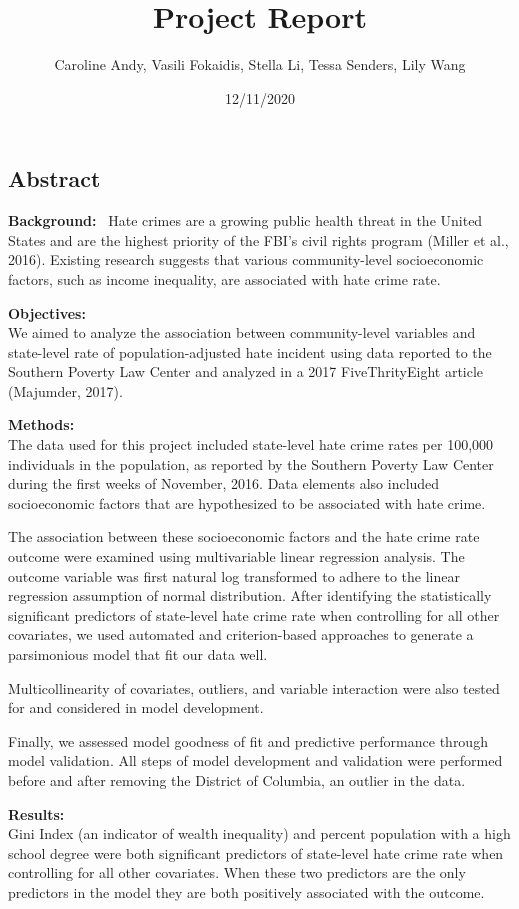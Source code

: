 \documentclass[
]{article}
\title{Project Report}
\author{Caroline Andy, Vasili Fokaidis, Stella Li, Tessa Senders, Lily Wang}
\date{12/11/2020}
\begin{document}
\maketitle

\hypertarget{abstract}{%
\subsection{Abstract}\label{abstract}}

\textbf{Background:}~ Hate crimes are a growing public health threat in
the United States and are the highest priority of the FBI's civil rights
program (Miller et al., 2016). Existing research suggests that various
community-level socioeconomic factors, such as income inequality, are
associated with hate crime rate.

\textbf{Objectives:}\\
We aimed to analyze the association between community-level variables
and state-level rate of population-adjusted hate incident using data
reported to the Southern Poverty Law Center and analyzed in a 2017
FiveThrityEight article (Majumder, 2017).

\textbf{Methods:}\\
The data used for this project included state-level hate crime rates per
100,000 individuals in the population, as reported by the Southern
Poverty Law Center during the first weeks of November, 2016. Data
elements also included socioeconomic factors that are hypothesized to be
associated with hate crime.

The association between these socioeconomic factors and the hate crime
rate outcome were examined using multivariable linear regression
analysis. The outcome variable was first natural log transformed to
adhere to the linear regression assumption of normal distribution. After
identifying the statistically significant predictors of state-level hate
crime rate when controlling for all other covariates, we used automated
and criterion-based approaches to generate a parsimonious model that fit
our data well.

Multicollinearity of covariates, outliers, and variable interaction were
also tested for and considered in model development.

Finally, we assessed model goodness of fit and predictive performance
through model validation. All steps of model development and validation
were performed before and after removing the District of Columbia, an
outlier in the data.

\textbf{Results:}\\
Gini Index (an indicator of wealth inequality) and percent population
with a high school degree were both significant predictors of
state-level hate crime rate when controlling for all other covariates.
When these two predictors are the only predictors in the model they are
both positively associated with the outcome.
\end{document}
